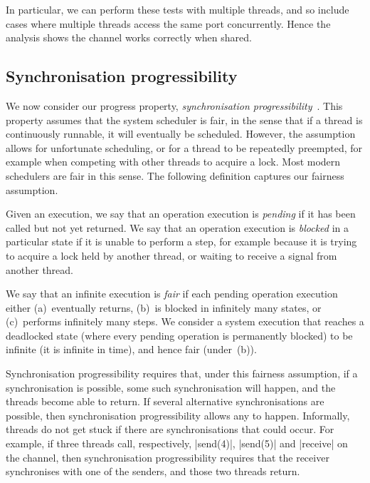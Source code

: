 In particular, we can perform these tests with multiple threads, and so
include cases where multiple threads access the same port concurrently.  Hence
the analysis shows the channel works correctly when shared. 


\subsection{Synchronisation progressibility}

We now consider our progress property, \emph{synchronisation
  progressibility}~\cite{LL:synchronisation}.  This property assumes that the
system scheduler is fair, in the sense that if a thread is continuously
runnable, it will eventually be scheduled.  However, the assumption allows for
unfortunate scheduling, or for a thread to be repeatedly preempted, for
example when competing with other threads to acquire a lock.  Most modern
schedulers are fair in this sense.
The following definition captures our fairness assumption.
%
\begin{definition}
Given an execution, we say that an operation execution is \emph{pending} if it
has been called but not yet returned.  We say that an operation execution is
\emph{blocked} in a particular state if it is unable to perform a step, for
example because it is trying to acquire a lock held by another thread, or
waiting to receive a signal from another thread.

We say that an infinite execution is \emph{fair} if each pending operation
execution either (a)~eventually returns, (b)~is blocked in infinitely many
states, or (c)~performs infinitely many steps.  We consider a system execution
that reaches a deadlocked state (where every pending operation is permanently
blocked) to be infinite (it is infinite in time), and hence fair (under~(b)).
\end{definition}


Synchronisation progressibility requires that, under this fairness assumption,
if a synchronisation is possible, some such synchronisation will happen, and
the threads become able to return.  If several alternative synchronisations
are possible, then synchronisation progressibility allows any to happen.
Informally, threads do not get stuck if there are synchronisations that could
occur.  For example, if three threads call, respectively, |send(4)|, |send(5)|
and |receive| on the channel, then synchronisation progressibility requires
that the receiver synchronises with one of the senders, and those two threads
return.


